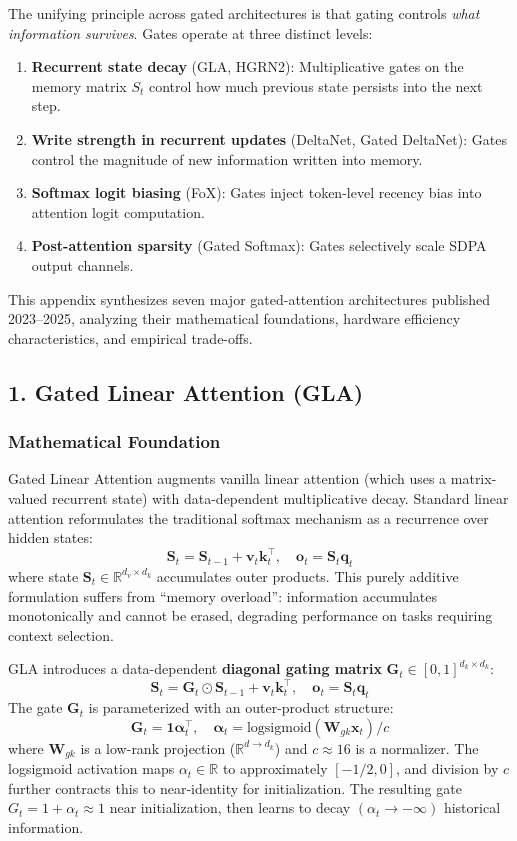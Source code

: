 \documentclass[11pt,a4paper]{article}
\begin{document}
The unifying principle across gated architectures is that gating controls \textit{what information survives}. Gates operate at three distinct levels:
\begin{enumerate}[leftmargin=*]
    \item \textbf{Recurrent state decay} (GLA, HGRN2): Multiplicative gates on the memory matrix $S_t$ control how much previous state persists into the next step.
    \item \textbf{Write strength in recurrent updates} (DeltaNet, Gated DeltaNet): Gates control the magnitude of new information written into memory.
    \item \textbf{Softmax logit biasing} (FoX): Gates inject token-level recency bias into attention logit computation.
    \item \textbf{Post-attention sparsity} (Gated Softmax): Gates selectively scale SDPA output channels.
\end{enumerate}

This appendix synthesizes seven major gated-attention architectures published 2023--2025, analyzing their mathematical foundations, hardware efficiency characteristics, and empirical trade-offs.

\subsection{1. Gated Linear Attention (GLA)}

\subsubsection{Mathematical Foundation}

Gated Linear Attention \citep{yang_gla_2023} augments vanilla linear attention (which uses a matrix-valued recurrent state) with data-dependent multiplicative decay. Standard linear attention reformulates the traditional softmax mechanism as a recurrence over hidden states:
\[
\mathbf{S}_t = \mathbf{S}_{t-1} + \mathbf{v}_t \mathbf{k}_t^\top, \quad \mathbf{o}_t = \mathbf{S}_t \mathbf{q}_t
\]
where state $\mathbf{S}_t \in \mathbb{R}^{d_v \times d_k}$ accumulates outer products. This purely additive formulation suffers from ``memory overload'': information accumulates monotonically and cannot be erased, degrading performance on tasks requiring context selection.

GLA introduces a data-dependent \textbf{diagonal gating matrix} $\mathbf{G}_t \in [0,1]^{d_k \times d_k}$:
\[
\mathbf{S}_t = \mathbf{G}_t \odot \mathbf{S}_{t-1} + \mathbf{v}_t \mathbf{k}_t^\top, \quad \mathbf{o}_t = \mathbf{S}_t \mathbf{q}_t
\]
The gate $\mathbf{G}_t$ is parameterized with an outer-product structure:
\[
\mathbf{G}_t = \mathbf{1} \boldsymbol{\alpha}_t^\top, \quad \boldsymbol{\alpha}_t = \text{logsigmoid}\left(\mathbf{W}_{gk} \mathbf{x}_t\right) / c
\]
where $\mathbf{W}_{gk}$ is a low-rank projection ($\mathbb{R}^{d \to d_k}$) and $c \approx 16$ is a normalizer. The logsigmoid activation maps $\alpha_t \in \mathbb{R}$ to approximately $[-1/2, 0]$, and division by $c$ further contracts this to near-identity for initialization. The resulting gate $G_t = 1 + \alpha_t \approx 1$ near initialization, then learns to decay $(\alpha_t \to -\infty)$ historical information.
\end{document}
